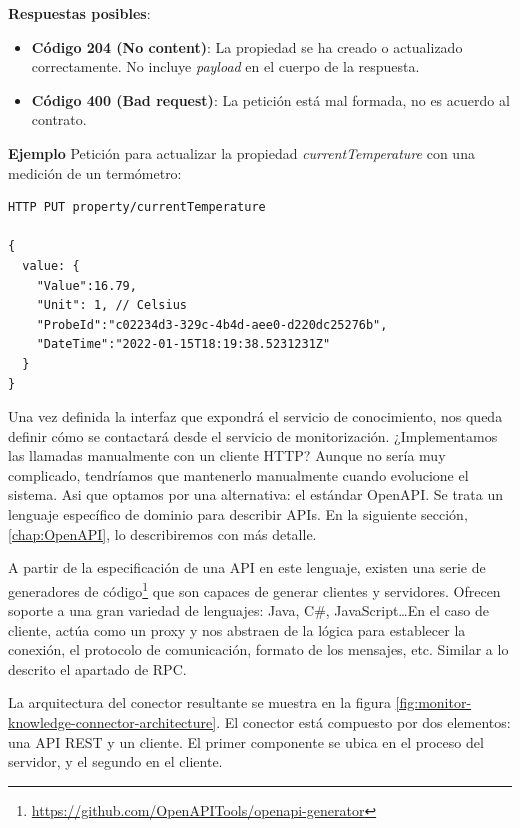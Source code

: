 \begin{itemize}
  \textbf{Respuestas posibles}:

  \begin{itemize}
    \item \textbf{Código 204 (No content)}: La propiedad se ha creado o actualizado correctamente. No incluye \textit{payload} en el cuerpo de la respuesta.

    \item \textbf{Código 400 (Bad request)}: La petición está mal formada, no es acuerdo al contrato.
  \end{itemize}

  \textbf{Ejemplo} Petición para actualizar la propiedad \textit{currentTemperature} con una medición de un termómetro:

  \begin{verbatim}
HTTP PUT property/currentTemperature

{
  value: {
    "Value":16.79,
    "Unit": 1, // Celsius
    "ProbeId":"c02234d3-329c-4b4d-aee0-d220dc25276b",
    "DateTime":"2022-01-15T18:19:38.5231231Z"
  }
}
  \end{verbatim}
\end{itemize}

Una vez definida la interfaz que expondrá el servicio de conocimiento, nos queda definir cómo se contactará desde el servicio de monitorización. ¿Implementamos las llamadas manualmente con un cliente HTTP? Aunque no sería muy complicado, tendríamos que mantenerlo manualmente cuando evolucione el sistema. Asi que optamos por una alternativa: el estándar OpenAPI. Se trata un lenguaje específico de dominio para describir APIs. En la siguiente sección, \ref{chap:OpenAPI}, lo describiremos con más detalle.

A partir de la especificación de una API en este lenguaje, existen una serie de generadores de código\footnote{\url{https://github.com/OpenAPITools/openapi-generator}} que son capaces de generar clientes y servidores. Ofrecen soporte a una gran variedad de lenguajes: Java, C\#, JavaScript\dots En el caso de cliente, actúa como un proxy y nos abstraen de la lógica para establecer la conexión, el protocolo de comunicación, formato de los mensajes, etc. Similar a lo descrito el apartado de RPC.

La arquitectura del conector resultante se muestra en la figura \ref{fig:monitor-knowledge-connector-architecture}. El conector está compuesto por dos elementos: una API REST y un cliente. El primer componente se ubica en el proceso del servidor, y el segundo en el cliente.



